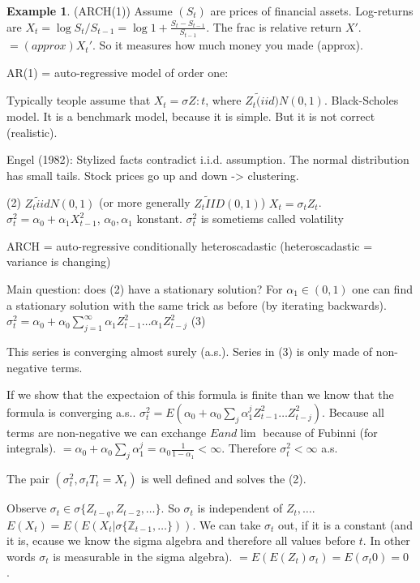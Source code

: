 \documentclass[12pt,a4paper]{amsart}
\theoremstyle{definition} %
\newtheorem{example}[defn]{Example}
\theoremstyle{plain} %
\newcommand{\Z}{\mathbb Z}
\begin{document}
\begin{example}(ARCH(1))
Assume $(S_t)$ are prices of financial assets. Log-returns are $X_t = \log{S_t / S_{t-1}} = \log{1 + \frac{S_t - S_{t-1}}{S_{t-1}}}$. The frac is relative return $X'$. 
$= (approx) X_t'$. So it measures how much money you made (approx).

AR(1) = auto-regressive model of order one:

Typically teople assume that $X_t = \sigma Z:t$, where $Z_t \tilde (iid) N(0,1)$. Black-Scholes model. It is a benchmark model, because it is simple. But it is not correct (realistic).



Engel (1982):
Stylized facts contradict i.i.d. assumption. The normal distribution has small tails. Stock prices go up and down -> clustering.

(2)
$Z_t \tilde iid N(0,1)$ (or more generally $Z_t \tilde IID(0,1)$)
$X_t = \sigma_t Z_t$.
$\sigma_t^2 = \alpha_0 + \alpha_1 X_{t-1}^2$, $\alpha_0, \alpha_1$ konstant.
$\sigma_t^2$ is sometiems called volatility

ARCH = auto-regressive conditionally heteroscadastic (heteroscadastic = variance is changing)

Main question: does 
(2) have a stationary solution? 
For $\alpha_1 \in (0,1)$ one can find a stationary solution with the same trick as before (by iterating backwards).
$\sigma_t^2 = \alpha_0 + \alpha_0 \sum_{j = 1}^\infty \alpha_1 Z_{t-1}^2 \dots \alpha_1Z_{t-j}^2$ 
(3)

This series is converging almost surely (a.s.). 
Series in 
(3) is only made of non-negative terms. 

If we show that the expectaion of this formula is finite than we know that the formula is converging a.s..
$\sigma_t^2 = E(\alpha_0 + \alpha_0 \sum_j \alpha_1^j Z_{t-1}^2 \dots Z_{t-j}^2)$.
Because all terms are non-negative we can exchange $E and \lim$ because of Fubinni (for integrals).
$ = \alpha_0 + \alpha_0 \sum_j \alpha_1^j = \alpha_0 \frac{1}{1-\alpha_1} < \infty$. Therefore $\sigma_t^2 < \infty$ a.s.

The pair $(\sigma_t^2, \sigma_tT_t = X_t)$ is well defined and solves the 
(2).

Observe $\sigma_t \in \sigma\{ Z_{t-q},Z_{t-2}, \dots\}$. So $\sigma_t$ is independent of $Z_t, \dots$.
$E(X_t) = E(E(X_t | \sigma\{\Z_{t-1}, \dots\}))$. We can take $\sigma_t$ out, if it is a constant (and it is, ecause we know the sigma algebra and therefore all values before $t$. In other words $\sigma_t$ is measurable in the sigma algebra). 
$ =E(E(Z_t)\sigma_t)= E(\sigma_t 0) = 0$ .


\end{example}
\end{document}
